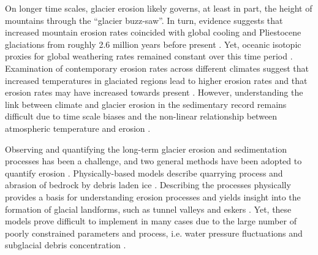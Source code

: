 \documentclass[esurf, manuscript]{copernicus}
\begin{document}
    On longer time scales, glacier erosion likely governs, at least in part,
    the height of mountains \citep{Egholm.etal.2009,Thomson.etal.2010} through
    the ``glacier buzz-saw''. In turn, evidence suggests that increased
    mountain erosion rates coincided with global cooling and Pliestocene
    glaciations from roughly 2.6 million years before present
    \citep{Herman.Champagnac.2016}. Yet, oceanic isotopic proxies for global
    weathering rates remained constant over this time period
    \citep{Willenbring.Von-Blanckenburg.2010}. Examination of contemporary
    erosion rates across different climates suggest that increased temperatures
    in glaciated regions lead to higher erosion rates and that erosion rates
    may have increased towards present \citep{Koppes.Montgomery.2009,
    Koppes.etal.2015, Fernandez.etal.2016}. However, understanding the link
    between climate and glacier erosion in the sedimentary record remains
    difficult due to time scale biases \citep{Ganti.etal.2016} and the
    non-linear relationship  between atmospheric temperature and erosion
    \citep[e.g.,][]{Anderson.etal.2012,Mariotti.etal.2021}.

    Observing and quantifying the long-term glacier erosion and sedimentation
    processes has been a challenge, and two general methods have been adopted
    to quantify erosion \citep{Alley.etal.2019}. Physically-based models
    describe quarrying process and abrasion of bedrock by debris laden ice
    \citep[e.g.,][]{Alley.etal.1997, Iverson.2012, Beaud.etal.2014}. Describing
    the processes physically provides a basis for understanding erosion
    processes \citep{Hallet.1979, Ugelvig.etal.2018} and yields insight into
    the formation of glacial landforms, such as tunnel valleys and eskers
    \citep{Beaud.etal.2018, Hewitt.Creyts.2019}. Yet, these models prove
    difficult to implement in many cases due to the large number of poorly
    constrained parameters and process, i.e. water pressure fluctuations and
    subglacial debris concentration \citep[e.g.,][]{Hallet.1979, Seguinot.2008,
    Ugelvig.etal.2018}.
\end{document}
